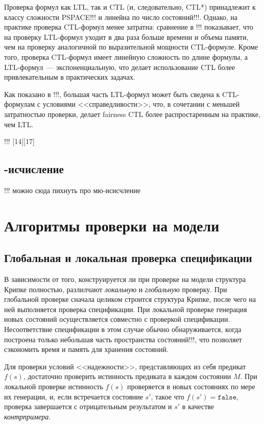\documentclass[a4paper,notitlepage,14pt]{article}
\begin{document}
Проверка формул как LTL, так и CTL (и, следовательно, CTL*) принадлежит к классу сложности
PSPACE!!! и линейна по число состояний!!!. Однако, на практике проверка CTL-формул менее
затратна: сравнение в !!! показывает, что на проверку LTL-формул уходит в два раза больше
времени и объема памяти, чем на проверку аналогичной по выразительной мощности
CTL-формуле. Кроме того, проверка CTL-формул имеет линейную сложность по длине формулы, а
LTL-формул~--- экспоненциальную, что делает использование CTL более привлекательным в
практических задачах.

Как показано в !!!, большая часть LTL-формул может быть сведена к CTL-формулам с условиями
<<справедливости>>, что, в сочетании с меньшей затратностью проверки, делает fairness CTL
более распростаренным на практике, чем LTL.

!!! [14][17]

\subsection{\mu-исчисление}
\label{sec:mu-calculus}

!!! можно сюда пихнуть про мю-исисчление

\section{Алгоритмы проверки на модели}
\label{sec:modelchk-methods}

\subsection{Глобальная и локальная проверка спецификации}
\label{sec:global}

В зависимости от того, конструируется ли при проверке на модели структура Крипке
полностью, разлилчают \emph{локальную} и \emph{глобальную} проверку. При глобальной
проверке сначала целиком строится структура Крипке, после чего на ней выполняется проверка
спецификации. При локальной проверке генерация новых состояний осуществляется совместно с
проверкой спецификации. Несоответствие спецификации в этом случае обычно обнаруживается,
когда построена только небольшая часть пространства состояний!!!, что позволяет сэкономить
время и память для хранения состояний.

Для проверки условий <<надежности>>, представляющих из себя предикат $f(s)$, достаточно
проверить истинность предиката в каждом состоянии $M$. При локальной проверке истинность
$f(s)$ проверяется в новых состояниях по мере их генерации, и, если встречается состояние
$s'$, такое что $f(s') = \mathtt{false}$, проверка завершается с отрицательным результатом
и $s'$ в качестве \emph{контрпримера}.
\end{document}

